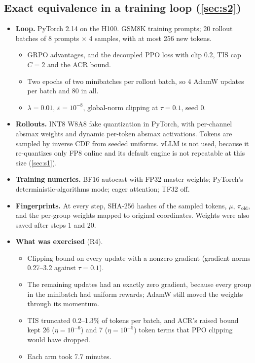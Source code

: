 \subsection{Exact equivalence in a training loop (\texorpdfstring{\cref{sec:s2}}{Section 6.2})}
\begin{itemize}[leftmargin=*,itemsep=2pt]
\item \textbf{Loop.} PyTorch 2.14 on the H100. GSM8K training prompts; 20 rollout batches of 8 prompts $\times$ 4 samples, with at most 256 new tokens.
  \begin{itemize}[leftmargin=*,itemsep=1pt]
  \item GRPO advantages, and the decoupled PPO loss with clip 0.2, TIS cap $C=2$ and the ACR bound.
  \item Two epochs of two minibatches per rollout batch, so 4 AdamW updates per batch and 80 in all.
  \item $\lambda=0.01$, $\varepsilon=10^{-8}$, global-norm clipping at $\tau=0.1$, seed 0.
  \end{itemize}
\item \textbf{Rollouts.} INT8 W8A8 fake quantization in PyTorch, with per-channel absmax weights and dynamic per-token absmax activations. Tokens are sampled by inverse CDF from seeded uniforms. vLLM is not used, because it re-quantizes only FP8 online and its default engine is not repeatable at this size (\cref{sec:s1}).
\item \textbf{Training numerics.} BF16 autocast with FP32 master weights; PyTorch's deterministic-algorithms mode; eager attention; TF32 off.
\item \textbf{Fingerprints.} At every step, SHA-256 hashes of the sampled tokens, $\mu$, $\pi_{\mathrm{old}}$, and the per-group weights mapped to original coordinates. Weights were also saved after steps 1 and 20.
\item \textbf{What was exercised} (R4).
  \begin{itemize}[leftmargin=*,itemsep=1pt]
  \item Clipping bound on every update with a nonzero gradient (gradient norms 0.27--3.2 against $\tau=0.1$).
  \item The remaining updates had an exactly zero gradient, because every group in the minibatch had uniform rewards; AdamW still moved the weights through its momentum.
  \item TIS truncated 0.2--1.3\% of tokens per batch, and ACR's raised bound kept 26 ($\eta=10^{-6}$) and 7 ($\eta=10^{-5}$) token terms that PPO clipping would have dropped.
  \item Each arm took 7.7 minutes.
  \end{itemize}
\end{itemize}

